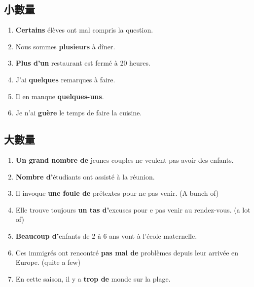 \documentclass{book}
\begin{document}
        \subsection{小數量}
            \begin{enumerate}
                \item \textbf{Certains} élèves ont mal compris la question.
                \item Nous sommes \textbf{plusieurs} à dîner.
                \item \textbf{Plus d'un} restaurant est fermé à 20 heures.
                \item J'ai \textbf{quelques} remarques à faire.
                \item Il en manque \textbf{quelques-uns}.
                \item Je n'ai \textbf{guère} le temps de faire la cuisine.
            \end{enumerate}
        \subsection{大數量}
            \begin{enumerate}
                \item \textbf{Un grand nombre de} jeunes couples ne veulent pas avoir des enfants.
                \item \textbf{Nombre d'}étudiants ont assisté à la réunion.
                \item Il invoque \textbf{une foule de} prétextes pour ne pas venir. (A bunch of)
                \item Elle trouve toujours \textbf{un tas d'}excuses pour e pas venir au rendez-vous. (a lot of)
                \item \textbf{Beaucoup d'}enfants de 2 à 6 ans vont à l'école maternelle.
                \item Ces immigrés ont rencontré \textbf{pas mal de} problèmes depuis leur arrivée en Europe. (quite a few)
                \item En cette saison, il y a \textbf{trop de} monde sur la plage.
            \end{enumerate}
\end{document}
